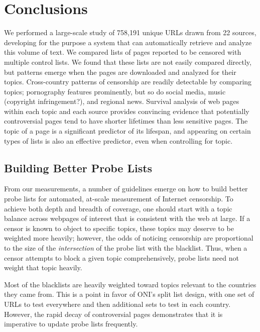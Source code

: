 \section{Conclusions}
\label{s:discussion}
\label{s:conclusions}

We performed a large-scale study of 758,191 unique URLs drawn from 22
sources, developing for the purpose a system that can automatically
retrieve and analyze this volume of text.  We compared lists of pages
reported to be censored with multiple control lists.  We found that
these lists are not easily compared directly, but patterns emerge when
the pages are downloaded and analyzed for their topics.  Cross-country
patterns of censorship are readily detectable by comparing topics;
pornography features prominently, but so do social media, music
(copyright infringement?), and regional news.  Survival analysis of
web pages within each topic and each source provides convincing
evidence that potentially controversial pages tend to have shorter
lifetimes than less sensitive pages.  The topic of a page is a
significant predictor of its lifespan, and appearing on certain types
of lists is also an effective predictor, even when controlling for
topic.

\subsection{Building Better Probe Lists}

From our measurements, a number of guidelines emerge on how to build
better probe lists for automated, at-scale measurement of Internet
censorship.  To achieve both depth and breadth of coverage, one should
start with a topic balance across webpages of interest that is
consistent with the web at large. If a censor is known to object to
specific topics, these topics may deserve to be weighted more heavily;
however, the odds of noticing censorship are proportional to the size
of the \emph{intersection} of the probe list with the blacklist. Thus,
when a censor attempts to block a given topic comprehensively, probe
lists need not weight that topic heavily.

Most of the blacklists are heavily weighted toward topics relevant to
the countries they came from.  This is a point in favor of ONI's split
list design, with one set of URLs to test everywhere and then
additional sets to test in each country.  However, the rapid decay of
controversial pages demonstrates that it is imperative to update probe
lists frequently.

